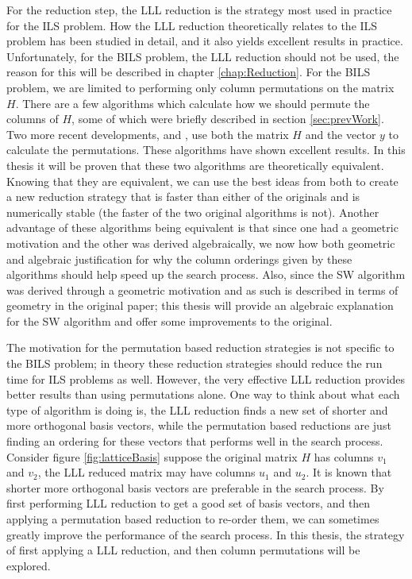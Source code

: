 \documentclass[12pt,Bold,letterpaper]{mcgilletdclass}
\begin{document}
For the reduction step, the LLL reduction \cite{LenLL82} is the strategy most used in practice for the ILS problem. How the LLL reduction theoretically relates to the ILS problem has been studied in detail, and it also yields excellent results in practice. Unfortunately, for the BILS problem, the LLL reduction should not be used, the reason for this will be described in chapter \ref{chap:Reduction}. For the BILS problem, we are limited to performing only column permutations on the matrix $H$. There are a few algorithms which calculate how we should permute the columns of $H$, some of which were briefly described in section \ref{sec:prevWork}. Two more recent developments, \cite{ChaH05} and \cite{SuW05}, use both the matrix $H$ and the vector $y$ to calculate the permutations. These algorithms have shown excellent results. In this thesis it will be proven that these two algorithms are theoretically equivalent. Knowing that they are equivalent, we can use the best ideas from both to create a new reduction strategy that is faster than either of the originals and is numerically stable (the faster of the two original algorithms is not). Another advantage of these algorithms being equivalent is that since one had a geometric motivation and the other was derived algebraically, we now how both geometric and algebraic justification for why the column orderings given by these algorithms should help speed up the search process. Also, since the SW algorithm was derived through a geometric motivation and as such is described in terms of geometry in the original paper; this thesis will provide an algebraic explanation for the SW algorithm and offer some improvements to the original.

The motivation for the permutation based reduction strategies is not specific to the BILS problem; in theory these reduction strategies should reduce the run time for ILS problems as well. However, the very effective LLL reduction provides better results than using permutations alone. One way to think about what each type of algorithm is doing is, the LLL reduction finds a new set of shorter and more orthogonal basis vectors, while the permutation based reductions are just finding an ordering for these vectors that performs well in the search process. Consider figure \ref{fig:latticeBasis} suppose the original matrix $H$ has columns $v_1$ and $v_2$, the LLL reduced matrix may have columns $u_1$ and $u_2$. It is known that shorter more orthogonal basis vectors are preferable in the search process. By first performing LLL reduction to get a good set of basis vectors, and then applying a permutation based reduction to re-order them, we can sometimes greatly improve the performance of the search process. In this thesis, the strategy of first applying a LLL reduction, and then column permutations will be explored.
\end{document}
